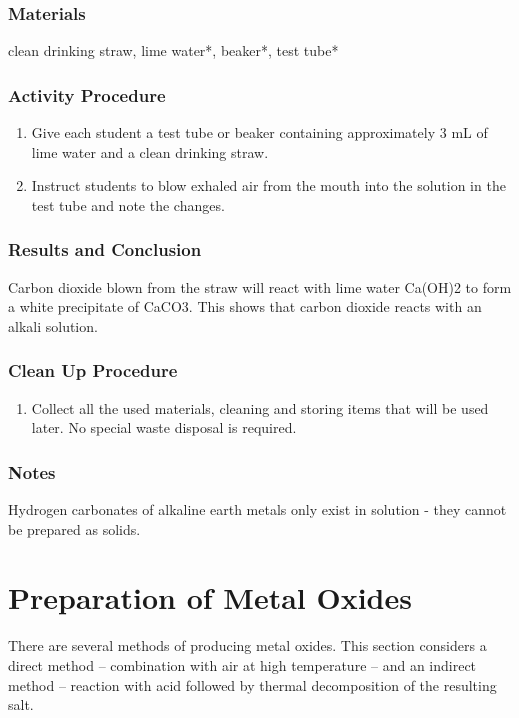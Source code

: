 \subsubsection*{Materials}
clean drinking straw, lime water*, beaker*, test tube*

\subsubsection*{Activity Procedure}
\begin{enumerate}
\item{Give each student a test tube or beaker containing approximately 3 mL of lime water and a clean drinking straw.}
\item{Instruct students to blow exhaled air from the mouth into the solution in the test tube and note the changes.}
\end{enumerate}

\subsubsection*{Results and Conclusion}
Carbon dioxide blown from the straw will react with lime water Ca(OH)2 to form a white precipitate of CaCO3. This shows that carbon dioxide reacts with an alkali solution.

\subsubsection*{Clean Up Procedure}
\begin{enumerate}
\item{Collect all the used materials, cleaning and storing items that will be used later. No special waste disposal is required.}
\end{enumerate}

\subsubsection*{Notes}
Hydrogen carbonates of alkaline earth metals only exist in solution - they cannot be prepared as solids.

\section{Preparation of Metal Oxides}

There are several methods of producing metal oxides. This section considers a direct method -- combination with air at high temperature -- and an indirect method -- reaction with acid followed by thermal decomposition of the resulting salt.

